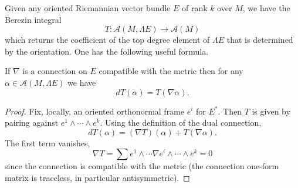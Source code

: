 \documentclass{amsart}
\begin{document}
Given any oriented Riemannian vector bundle $E$ of rank $k$ over $M$, we have
the Berezin integral
\begin{equation*}
    T: \mathcal{A}(M, \Lambda E)\to \mathcal{A}(M)
\end{equation*}
which returns the coefficient of the top degree element of $\Lambda E$ that is
determined by the orientation. One has the following useful formula.
\begin{lemma}
    If $\nabla$ is a connection on $E$ compatible with the metric then for any
    $\alpha\in \mathcal{A}(M,\Lambda E)$ we have
    \begin{equation*}
        dT(\alpha) = T(\nabla \alpha).
    \end{equation*}
\end{lemma}
\begin{proof}
    Fix, locally, an oriented orthonormal frame $e^i$ for $E^*$. Then $T$ is
    given by pairing against $e^1\wedge\cdots\wedge e^k$. Using the definition
    of the dual connection,
    \begin{equation*}
        dT(\alpha) = (\nabla T)(\alpha) + T(\nabla \alpha).
    \end{equation*}
    The first term vanishes,
    \begin{equation*}
        \nabla T = \sum e^1\wedge\cdots \nabla e^i\wedge\cdots\wedge e^k = 0
    \end{equation*}
    since the connection is compatible with the metric (the connection one-form
    matrix is traceless, in particular antisymmetric).
\end{proof}
\end{document}
